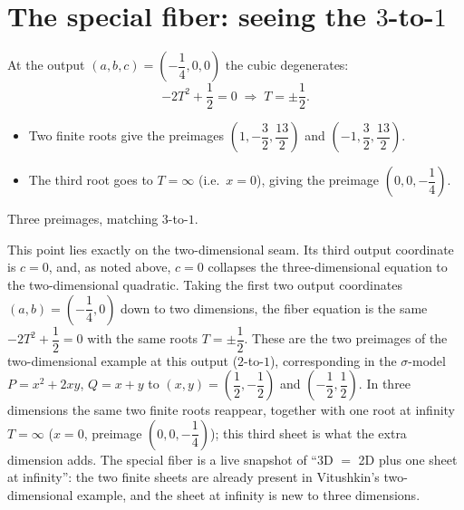 \documentclass[11pt]{article}
\theoremstyle{plain}
\theoremstyle{definition}
\begin{document}
\section*{The special fiber: seeing the $3$-to-$1$}
At the output $(a,b,c)=\left(-\dfrac14,0,0\right)$ the cubic degenerates:
\[
  -2T^2+\frac12=0 \;\Longrightarrow\; T=\pm\frac12 .
\]
\begin{itemize}[nosep]
  \item Two finite roots give the preimages
        $\left(1,-\dfrac32,\dfrac{13}{2}\right)$ and
        $\left(-1,\dfrac32,\dfrac{13}{2}\right)$.
  \item The third root goes to $T=\infty$ (i.e.\ $x=0$), giving the preimage
        $\left(0,0,-\dfrac14\right)$.
\end{itemize}
Three preimages, matching $3$-to-$1$.

This point lies exactly on the two-dimensional seam. Its third output
coordinate is $c=0$, and, as noted above, $c=0$ collapses the
three-dimensional equation to the two-dimensional quadratic. Taking the first
two output coordinates $(a,b)=\left(-\dfrac14,0\right)$ down to two
dimensions, the fiber equation is the same $-2T^2+\dfrac12=0$ with the same
roots $T=\pm\dfrac12$. These are the two preimages of the two-dimensional
example at this output ($2$-to-$1$), corresponding in the $\sigma$-model
$P=x^2+2xy$, $Q=x+y$ to $(x,y)=\left(\dfrac12,-\dfrac12\right)$ and
$\left(-\dfrac12,\dfrac12\right)$. In three dimensions the same two finite
roots reappear, together with one root at infinity $T=\infty$ ($x=0$,
preimage $\left(0,0,-\dfrac14\right)$); this third sheet is what the extra
dimension adds. The special fiber is a live snapshot of ``3D $=$ 2D plus one
sheet at infinity'': the two finite sheets are already present in Vitushkin's
two-dimensional example, and the sheet at infinity is new to three
dimensions.

\end{document}
